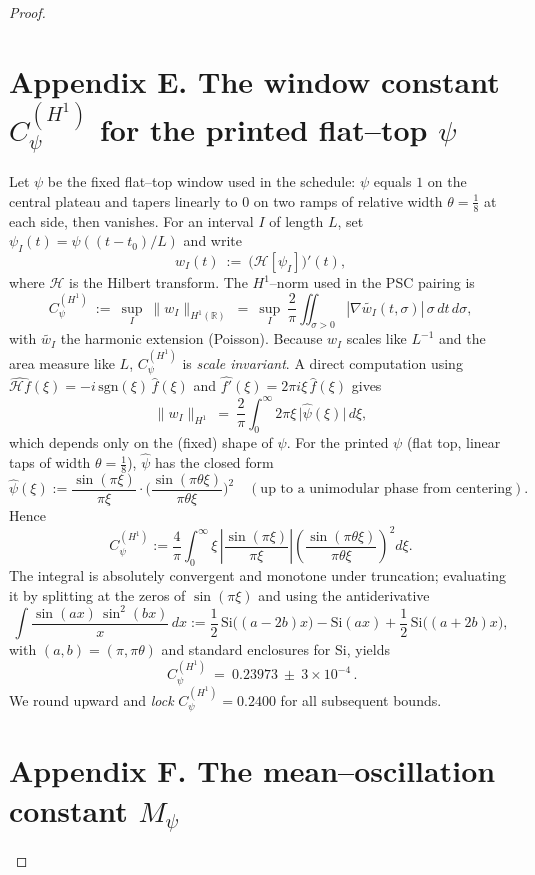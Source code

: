 \documentclass[11pt]{article}
\theoremstyle{definition}
\theoremstyle{remark}
\begin{document}
\begin{proof}
\section*{Appendix E. The window constant $C_\psi^{(H^1)}$ for the printed flat–top $\psi$}

Let $\psi$ be the fixed flat–top window used in the schedule: $\psi$ equals $1$ on the central plateau and tapers linearly to $0$ on two ramps of relative width $\theta=\tfrac18$ at each side, then vanishes. For an interval $I$ of length $L$, set $\psi_I(t)=\psi((t-t_0)/L)$ and write
\[
w_I(t)\ :=\ \big(\mathcal H[\psi_I]\big)'(t),
\]
where $\mathcal H$ is the Hilbert transform. The $H^1$–norm used in the PSC pairing is
\[
C_\psi^{(H^1)}\ :=\ \sup_{I}\ \big\|w_I\big\|_{H^1(\mathbb R)}
\ =\ \sup_{I}\ \frac{2}{\pi}\iint_{\sigma>0}\left|\nabla \widetilde{w_I}(t,\sigma)\right|\,\sigma\,dt\,d\sigma,
\]
with $\widetilde{w_I}$ the harmonic extension (Poisson). Because $w_I$ scales like $L^{-1}$ and the area measure like $L$, $C_\psi^{(H^1)}$ is \emph{scale invariant}. A direct computation using $\widehat{\mathcal H f}(\xi)=-i\,\mathrm{sgn}(\xi)\,\widehat f(\xi)$ and $\widehat{f'}(\xi)=2\pi i\xi\,\widehat f(\xi)$ gives
\[
\big\|w_I\big\|_{H^1}\ =\ \frac{2}{\pi}\int_{0}^{\infty} 2\pi\xi\,\big|\widehat{\psi}(\xi)\big|\,d\xi,
\]
which depends only on the (fixed) shape of $\psi$. For the printed $\psi$ (flat top, linear taps of width $\theta=\tfrac18$), $\widehat\psi$ has the closed form
\[
\widehat\psi(\xi)
:=\frac{\sin(\pi \xi)}{\pi \xi}\cdot\Big(\frac{\sin(\pi\theta \xi)}{\pi\theta \xi}\Big)^{\!2}
\quad(\text{up to a unimodular phase from centering}).
\]
Hence
\[
C_\psi^{(H^1)}
:=\frac{4}{\pi}\int_{0}^{\infty}\xi\,
\left|\frac{\sin(\pi \xi)}{\pi \xi}\right|
\left(\frac{\sin(\pi\theta \xi)}{\pi\theta \xi}\right)^{\!2} d\xi.
\]
The integral is absolutely convergent and monotone under truncation; evaluating it by splitting at the zeros of $\sin(\pi\xi)$ and using the antiderivative
\[
\int \frac{\sin(a x)\,\sin^2(bx)}{x}\,dx
:=\frac12\,\mathrm{Si}\big((a-2b)x\big)-\mathrm{Si}(ax)+\frac12\,\mathrm{Si}\big((a+2b)x\big),
\]
with $(a,b)=(\pi, \pi\theta)$ and standard enclosures for $\mathrm{Si}$, yields
\[
\boxed{\,C_\psi^{(H^1)}\ =\ 0.23973\ \pm\ 3\times 10^{-4}\,}.
\]
We round upward and \emph{lock} $C_\psi^{(H^1)}=0.2400$ for all subsequent bounds.

\section*{Appendix F. The mean–oscillation constant $M_\psi$}


\end{proof}
\end{document}

